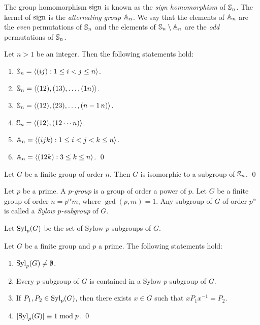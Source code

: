 The group homomorphism $\operatorname{sign}$ is known as the {\em sign homomorphism} of $\mathbb{S}_n$. 
The kernel of $\operatorname{sign}$ is the {\em alternating group} $\mathbb{A}_n$.
We say that the elements of $\mathbb{A}_n$ are the {\em even} permutations of $\mathbb{S}_n$ 
and the elements of $\mathbb{S}_n\setminus\mathbb{A}_n$
are the {\em odd} permutations of $\mathbb{S}_n$.

\begin{theorem}
Let $n>1$ be an integer. Then the following statements hold:  
\begin{enumerate}
    \item $\mathbb{S}_n=\langle (ij):1\leq i<j\leq n\rangle$. 
	\item $\mathbb{S}_n=\langle (12),(13),\dots,(1n)\rangle$.
	\item $\mathbb{S}_n=\langle (12),(23),\dots,(n-1\,n)\rangle$.
	\item $\mathbb{S}_n=\langle (12),(12\cdots n)\rangle$.
	\item $\mathbb{A}_n=\langle (ijk):1\leq i<j<k\leq n\rangle$.
	\item $\mathbb{A}_n=\langle (12k):3\leq k\leq n\rangle$. \qed
    \end{enumerate}
\end{theorem}

\begin{theorem}
    Let $G$ be a finite group of order $n$. Then $G$ is isomorphic to a subgroup of $\mathbb{S}_n$. \qed
\end{theorem}

Let $p$ be a prime. A {\em $p$-group} is a group of order a power of $p$. Let $G$ be a finite group of order
$n=p^\alpha m$, where $\gcd(p,m)=1$. 
Any subgroup of $G$ of order $p^\alpha$ is called a {\em Sylow $p$-subgroup} of $G$. 

Let 
$\mathrm{Syl}_p(G)$ be the set of Sylow $p$-subgroups of $G$. 

\begin{theorem}[Sylow]
    Let $G$ be a finite group and $p$ a prime. The following statements hold:
    \begin{enumerate}
        \item $\mathrm{Syl}_p(G)\ne\emptyset$.
        \item 
        Every $p$-subgroup of $G$ is contained in a Sylow $p$-subgroup of $G$.
        \item 
        If $P_1,P_2\in\mathrm{Syl}_p(G)$, then  
        there exists $x\in G$ such that $xP_1x^{-1}=P_2$. 
        \item 
        $|\mathrm{Syl}_p(G)|\equiv 1\bmod p$. \qed
    \end{enumerate}
\end{theorem}

